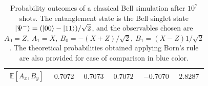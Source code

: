 \begin{table}[h!]
{\begin{tabular}{c | c | c | c | c | c}
$\mathbb{E}[A_x, B_y]$  & $\scriptstyle{0.7072}$ 
                        & $\scriptstyle{0.7073}$ 
                        & $\scriptstyle{0.7072}$ 
                        & $\scriptstyle{-0.7070}$ 
                        & $\scriptstyle{2.8287}$\\
\bottomrule
\end{tabular}}
\caption{Probability outcomes of a classical Bell simulation after $10^{7}$ shots. The entanglement state is the Bell singlet state $\ket{\Psi^{-}}=(\ket{00} - \ket{11})/\sqrt{2}$, and the observables chosen are $A_0=Z,\:A_1=X,\:B_0=-(X +Z)/\sqrt{2},\:B_1=(X - Z)1/\sqrt{2}$. The theoretical probabilities obtained applying Born’s rule are also
provided for ease of comparison in blue color.}
\label{table:classical_results_bell}
\end{table}
\clearpage

